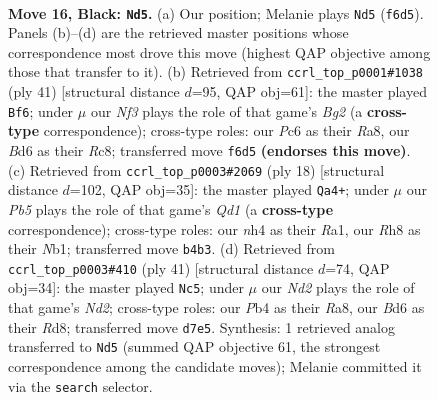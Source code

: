 \documentclass[11pt]{article}
\begin{document}
\clearpage

\begin{figure}[p]\centering
\begin{subfigure}{0.46\textwidth}\centering
\resizebox{\linewidth}{!}{%
\newchessgame
\chessboard[
  setfen={r6r/p2nkppp/q1pbpn2/5P2/Np1P2PN/4P3/PP5P/R1BQ1RK1 b - - 0 16},
  showmover=false,
  pgfstyle=straightmove, color=movearrow, markmove={f6-d5}
]}
\caption{}
\end{subfigure}\hfill
\begin{subfigure}{0.46\textwidth}\centering
\resizebox{\linewidth}{!}{%
\newchessgame
\chessboard[
  setfen={r1r3k1/pp1nppbp/1n1p2p1/q2P3P/3NP3/1P2B1P1/5PB1/1R1QR1K1 b - - 0 21},
  showmover=false,
  pgfstyle=straightmove, color=movearrow, markmove={g7-f6}
]}
\caption{}
\end{subfigure}
\\[4pt]
\begin{subfigure}{0.46\textwidth}\centering
\resizebox{\linewidth}{!}{%
\newchessgame
\chessboard[
  setfen={r1bqk2r/1pp2pp1/p2p1n1p/n3p3/2B1P3/2PPPN2/PP4PP/RN1Q1RK1 w kq - 1 10},
  showmover=false,
  pgfstyle=straightmove, color=movearrow, markmove={d1-a4}
]}
\caption{}
\end{subfigure}\hfill
\begin{subfigure}{0.46\textwidth}\centering
\resizebox{\linewidth}{!}{%
\newchessgame
\chessboard[
  setfen={r2r2k1/1p1n1pbp/2p2np1/p3pP2/P2qP3/2N2QP1/1PP3BP/R1B1K2R b KQ - 8 21},
  showmover=false,
  pgfstyle=straightmove, color=movearrow, markmove={d7-c5}
]}
\caption{}
\end{subfigure}
\caption{\textbf{Move 16, Black: \texttt{Nd5}.} (a) Our position; Melanie plays \texttt{Nd5} (\texttt{f6d5}). Panels (b)--(d) are the retrieved master positions whose correspondence most drove this move (highest QAP objective among those that transfer to it). (b) Retrieved from \texttt{ccrl\_top\_p0001\#1038} (ply 41) [structural distance $d$=95, QAP obj=61]: the master played \texttt{Bf6}; under $\mu$ our \emph{Nf3} plays the role of that game's \emph{Bg2} (a \textbf{cross-type} correspondence); cross-type roles: our \emph{P}c6 as their \emph{R}a8, our \emph{B}d6 as their \emph{R}c8; transferred move \texttt{f6d5} \textbf{(endorses this move)}. (c) Retrieved from \texttt{ccrl\_top\_p0003\#2069} (ply 18) [structural distance $d$=102, QAP obj=35]: the master played \texttt{Qa4+}; under $\mu$ our \emph{Pb5} plays the role of that game's \emph{Qd1} (a \textbf{cross-type} correspondence); cross-type roles: our \emph{n}h4 as their \emph{R}a1, our \emph{R}h8 as their \emph{N}b1; transferred move \texttt{b4b3}. (d) Retrieved from \texttt{ccrl\_top\_p0003\#410} (ply 41) [structural distance $d$=74, QAP obj=34]: the master played \texttt{Nc5}; under $\mu$ our \emph{Nd2} plays the role of that game's \emph{Nd2}; cross-type roles: our \emph{P}b4 as their \emph{R}a8, our \emph{B}d6 as their \emph{R}d8; transferred move \texttt{d7e5}. Synthesis: 1 retrieved analog transferred to \texttt{Nd5} (summed QAP objective 61, the strongest correspondence among the candidate moves); Melanie committed it via the \texttt{search} selector.}
\label{fig:thought-m31}
\end{figure}
\end{document}
